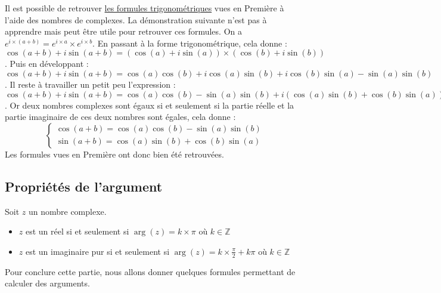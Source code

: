 	\begin{tip}
		\contentwidth[big]
		Il est possible de retrouver \href{https://bacomathiqu.es/cours/terminale/fonctions-trigonometriques/\#3-formules-de-trigonometrie}{les formules trigonométriques} vues en Première à l'aide des nombres de complexes. La démonstration suivante n'est pas à apprendre mais peut être utile pour retrouver ces formules.
		\newpar
		On a $e^{i \times (a + b)} = e^{i \times a} \times e^{i \times b}$.
		\newpar
		En passant à la forme trigonométrique, cela donne : $\cos(a + b) + i\sin(a + b) = (\cos(a) + i\sin(a)) \times (\cos(b) + i\sin(b))$.
		\newpar
		Puis en développant : $\cos(a + b) + i\sin(a + b) = \cos(a)\cos(b) + i\cos(a)\sin(b) + i\cos(b)\sin(a) - \sin(a)\sin(b)$.
		\newpar
		Il reste à travailler un petit peu l'expression : $\cos(a + b) + i\sin(a + b) = \cos(a)\cos(b) - \sin(a)\sin(b) + i(\cos(a)\sin(b) + \cos(b)\sin(a))$.
		\newpar
		Or deux nombres complexes sont égaux si et seulement si la partie réelle et la partie imaginaire de ces deux nombres sont égales, cela donne :
		\[ \begin{cases} \cos(a + b) = \cos(a)\cos(b) - \sin(a)\sin(b) \\ \sin(a + b) = \cos(a)\sin(b) + \cos(b)\sin(a) \end{cases} \]
		Les formules vues en Première ont donc bien été retrouvées.
	\end{tip}

	\subsection{Propriétés de l'argument}

	\begin{formula}[Propriétés]
		Soit $z$ un nombre complexe.
		\begin{itemize}
			\item $z$ est un réel si et seulement si $\operatorname{arg}(z) = k \times \pi$ où $k \in \mathbb{Z}$
			\item $z$ est un imaginaire pur si et seulement si $\operatorname{arg}(z) = k \times \frac{\pi}{2} + k\pi$ où $k \in \mathbb{Z}$
		\end{itemize}
	\end{formula}

	Pour conclure cette partie, nous allons donner quelques formules permettant de calculer des arguments.

